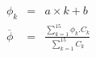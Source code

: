 \begin{eqnarray*}
\phi_k & = & a \times k + b \\
\overline{\phi} & = &
\frac{\displaystyle\sum_{k=1}^{15} \phi_k.C_k} 
     {\displaystyle\sum_{k=1}^{15} C_k} \\
\end{eqnarray*}

